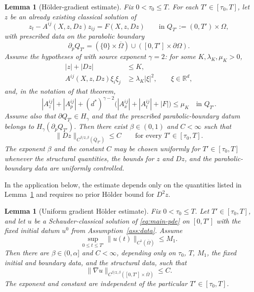 \documentclass[11pt]{article}
\newtheorem{lemma}[theorem]{Lemma}
\theoremstyle{remark}
\begin{document}
\begin{lemma}[H\"older-gradient estimate]
\label{lem:quoted-gradient}
Fix $0<\tau_0\leq T$. For each $T'\in[\tau_0,T]$, let $z$ be an already
existing classical solution of
\[
z_t-A^{ij}(X,z,Dz)z_{ij}=F(X,z,Dz)
\qquad\text{in }Q_{T'}:=(0,T')\times\Omega,
\]
with prescribed data on the parabolic boundary
\[
\partial_pQ_{T'}
=
(\{0\}\times\overline{\Omega})
\cup
([0,T']\times\partial\Omega).
\]
Assume the hypotheses of \cite[Theorem~4.7]{Lieberman1986} with
source exponent $\gamma=2$: for some $K,\lambda_K,\mu_K>0$,
\begin{align*}
|z|+|Dz|&\leq K,\\
A^{ij}(X,z,Dz)\xi_i\xi_j
&\geq \lambda_K|\xi|^2,
\qquad \xi\in\mathbb{R}^d,
\end{align*}
and, in the notation of that theorem,
\[
|A^{ij}_z|+|A^{ij}_p|
+(d^*)^{\gamma-2}
\bigl(
|A^{ij}_x|+|A^{ij}_t|+|F|
\bigr)
\leq \mu_K
\quad\text{in }Q_{T'}.
\]
Assume also that $\partial Q_{T'}\in H_\gamma$ and that the prescribed
parabolic-boundary datum belongs to
$H_\gamma(\partial_pQ_{T'})$. Then there exist
$\beta\in(0,1)$ and $C<\infty$ such that
\[
\|Dz\|_{C^{\beta/2,\beta}(\overline{Q}_{T'})}
\leq C
\qquad\text{for every }T'\in[\tau_0,T].
\]
The exponent $\beta$ and the constant $C$ may be chosen uniformly for
$T'\in[\tau_0,T]$ whenever the structural quantities, the bounds for
$z$ and $Dz$, and the parabolic-boundary data are uniformly controlled.
\end{lemma}

In the application below, the estimate depends only on the quantities
listed in Lemma~\ref{lem:quoted-gradient} and requires no prior H\"older
bound for $D^2z$.

\begin{lemma}[Uniform gradient H\"older estimate]\label{lem:gradient-holder}
Fix $0<\tau_0\le T$.  Let $T'\in[\tau_0,T]$, and let $u$ be a
Schauder-classical solution of \eqref{eq:main-pde} on $[0,T']$ with the fixed
initial datum $u^0$ from Assumption~\ref{ass:data}.  Assume
\[
 \sup_{0\le t\le T'}\|u(t)\|_{C^1(\overline\Omega)}\le M_1.
\]
Then there are $\beta\in(0,\alpha]$ and $C<\infty$, depending only on
$\tau_0$, $T$, $M_1$, the fixed initial and boundary data, and the
structural data, such that
\[
 \|\nabla u\|_{C^{\beta/2,\beta}([0,T']\times\overline\Omega)}\le C.
\]
The exponent and constant are independent of the particular
$T'\in[\tau_0,T]$.
\end{lemma}
\end{document}
